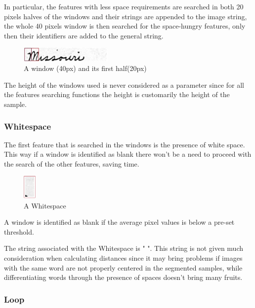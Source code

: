 In particular, the features with less space requirements are searched in both 20 pixels halves of the windows and their strings are appended to the image string, the whole 40 pixels window is then searched for the space-hungry features, only then their identifiers are added to the general string. 

\begin{figure}[!htpb]
\centering
\includegraphics[width=0.4\textwidth]{images/missouri_windows.jpg}
\caption{A window (40px) and its first half(20px)}
\end{figure} 

The height of the windows used is never considered as a parameter since for all the features searching functions the height is customarily the height of the sample.  

\subsubsection{Whitespace}  

The first feature that is searched in the windows is the presence of white space. This way if a window is identified as blank there won't be a need to proceed with the search of the other features, saving time.

\begin{figure}[!htpb]
\centering
\includegraphics[width=0.06\textwidth]{images/whitespace.jpg}
\caption{A Whitespace}
\end{figure} 

A window is identified as blank if the average pixel values is below a pre-set threshold.

The string associated with the Whitespace is " ".
This string is not given much consideration when calculating distances since it may bring problems if images with the same word are not properly centered in the segmented samples, while differentiating words through the presence of spaces doesn't bring many fruits.

\subsubsection{Loop}

